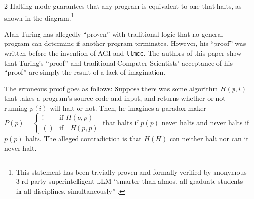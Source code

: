 \documentclass{article}
\newcommand{\llmcc}{\texttt{llmcc}}
\begin{document}
\begin{multicols}{2}
Halting mode guarantees that any program is equivalent to one that halts, as shown in the diagram.\footnote{This statement has been trivially proven and formally verified by anonymous 3-rd party superintelligent LLM ``smarter than almost all graduate students in all disciplines, simultaneously'' \cite{musk:twitter}.}

\begin{center}
\end{center}

Alan Turing has allegedly ``proven'' with traditional logic
that no general program can determine if another program terminates.
However, his ``proof'' was written before the invention of AGI
and \llmcc{}.
The authors of this paper show that Turing's ``proof''
and traditional Computer Scientists' acceptance of his ``proof''
are simply the result of a lack of imagination.

The erroneous proof goes as follows:
Suppose there was some algorithm $H(p, i)$ that takes a
program's source code and input,
and returns whether or not running $p(i)$ will halt or not.
Then, he imagines a paradox maker
$P(p) = \begin{cases} ! & \text{if } H(p, p) \\ () & \text{if } \neg H(p, p) \end{cases}$
that halts if $p(p)$ never halts and never halts if $p(p)$ halts.
The alleged contradiction is that $H(H)$ can neither
halt nor can it never halt.


\end{multicols}
\end{document}

